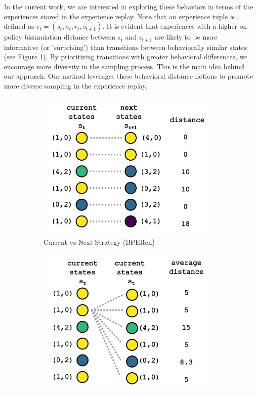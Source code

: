 In the current work, we are interested in exploring these behaviors in terms of the experiences stored in the experience replay. Note that an experience tuple is defined as \(e_t = (s_t, a_t, r_t, s_{t+1})\). It is evident that experiences with a higher on-policy bisimulation distance between \(s_t\) and \(s_{t+1}\) are likely to be more informative (or 'surprising') than transitions between behaviorally similar states (see Figure \ref{fig:current_vs_next}). By prioritizing transitions with greater behavioral differences, we encourage more diversity in the sampling process. This is the main idea behind our approach. Our method leverages these behavioral distance notions to promote more diverse sampling in the experience replay.
\begin{figure}[H]
    \centering
    \begin{subfigure}{0.45\textwidth}
    \includegraphics[width=\linewidth]{Figures/curr_vs_next.jpg}
        \caption{Current-vs-Next Strategy (BPERcn)}
        \label{fig:current_vs_next}
    \end{subfigure}
    \hfill
    \begin{subfigure}{0.45\textwidth}
        \includegraphics[width=\linewidth]{Figures/all_vs_all.jpg}

\end{subfigure}
\end{figure}

